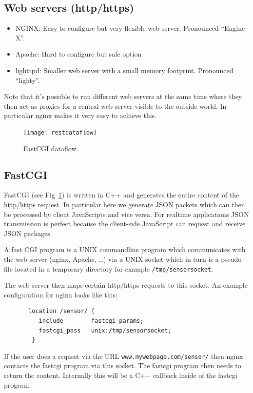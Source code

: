 \documentclass[12pt]{report}
\begin{document}
\subsection{Web servers (http/https)}

\begin{itemize}
  \item NGINX: Easy to configure but very flexible web server. Pronounced ``Engine-X''.
  \item Apache: Hard to configure but safe option
  \item lighttpd: Smaller web server with a small memory footprint. Pronounced ``lighty''.
\end{itemize}
Note that it's possible to run different web servers at the
same time where they then act as proxies for a central web
server visible to the outside world. In particular nginx
makes it very easy to achieve this.

\begin{figure}[h]
\begin{center}
\texttt{[image: restdataflow]}
\end{center}
\caption{FastCGI dataflow.\label{cgi}}
\end{figure}

\subsection{FastCGI}
FastCGI (see Fig~\ref{cgi}) is written in C++ and generates the entire
content of the http/https request. In particular here we generate
JSON packets which can then be processed by client JavaScripts and vice versa.
For realtime applications JSON transmission is perfect because the client-side
JavaScript can request and receive JSON packages

A fast CGI program is a UNIX commandline program which communicates with the web server
(nginx, Apache, \ldots) via a UNIX socket which in turn is a pseudo file located
in a temporary directory for example \texttt{/tmp/sensorsocket}.

The web server then maps certain http/https requests to
this socket. An example configuration for nginx looks like this:
\begin{verbatim}
       location /sensor/ {
          include        fastcgi_params;
          fastcgi_pass   unix:/tmp/sensorsocket;
        }
\end{verbatim}
If the user does a request via the URL \texttt{www.mywebpage.com/sensor/} then
nginx contacts the fastcgi program via this socket. The fastcgi program
then needs to return the content. Internally this will be a C++ callback
inside of the fastcgi program.
\end{document}
